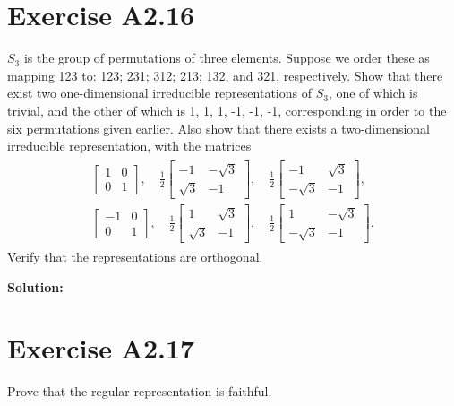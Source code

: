 \documentclass{book}
\begin{document}
\section*{Exercise A2.16}
    $S_3$ is the group of permutations of three elements. Suppose we order these as mapping 123 to: 123; 231; 312; 213; 132, and 321, respectively. Show that there exist two one-dimensional irreducible representations of $S_3$, one of which is trivial, and the other of which is 1, 1, 1, -1, -1, -1, corresponding in order to the six permutations given earlier. Also show that there exists a two-dimensional irreducible representation, with the matrices
    \begin{align}
    \begin{aligned}
        \begin{bmatrix}
            1 & 0 \\
            0 & 1
        \end{bmatrix}, \quad
        \frac{1}{2}
        \begin{bmatrix}
            -1 & -\sqrt{3} \\
            \sqrt{3} & -1
        \end{bmatrix}, \quad
        \frac{1}{2}
        \begin{bmatrix}
            -1 & \sqrt{3} \\
            -\sqrt{3} & -1
        \end{bmatrix}, \\
        \begin{bmatrix}
            -1 & 0 \\
            0 & 1
        \end{bmatrix}, \quad
        \frac{1}{2}
        \begin{bmatrix}
            1 & \sqrt{3} \\
            \sqrt{3} & -1
        \end{bmatrix}, \quad
        \frac{1}{2}
        \begin{bmatrix}
            1 & -\sqrt{3} \\
            -\sqrt{3} & -1
        \end{bmatrix}.
    \end{aligned}
    \end{align}
    Verify that the representations are orthogonal.
    
    \textbf{Solution:}

\section*{Exercise A2.17}
    Prove that the regular representation is faithful.
    
\end{document}
